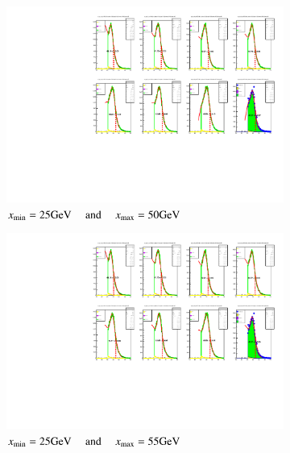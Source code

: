 \documentclass[11pt,a4paper,notitlepage]{scrartcl}
\begin{document}
\begin{figure}[H]
	\vspace{-0.3cm}
	\centering
	\begin{subfigure}{\linewidth}
		\includegraphics[width=\linewidth]{P1_pics/gauge/gauge_xmin_25_xmax_50.pdf}
		\caption{$x_\text{min}=25\text{GeV} \text{\phantom{ n } and \phantom{ n }} x_{\text{max}}=50\text{GeV}$}
	\end{subfigure}
	\begin{subfigure}{\linewidth}
		\includegraphics[width=\linewidth]{P1_pics/gauge/gauge_xmin_25_xmax_55.pdf}
		\caption{$x_\text{min}=25\text{GeV} \text{\phantom{ n } and \phantom{ n }} x_{\text{max}}=55\text{GeV}$}
	\end{subfigure}
	\caption{}
\end{figure}
\end{document}
